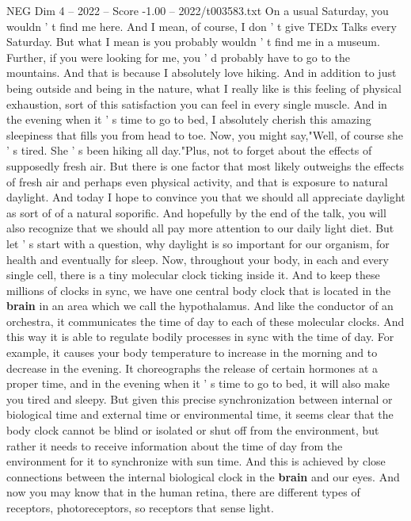 \begin{textsample}{NEG Dim 4 – 2022 – Score -1.00 – 2022/t003583.txt}  \label{ex:f4_neg_056}
On a usual Saturday, you wouldn ' t find me here.
And I mean, of course, I don ' t give TEDx Talks every Saturday.
But what I mean is you probably wouldn ' t find me in a museum.
Further, if you were looking for me, you ' d probably have to go to the mountains.
And that is because I absolutely love hiking.
And in addition to just being outside and being in the nature, what I really like is this feeling of physical exhaustion, sort of this satisfaction you can feel in every single muscle.
And in the evening when it ' s time to go to bed, I absolutely cherish this amazing sleepiness that fills you from head to toe.
Now, you might say,"Well, of course she ' s tired.
She ' s been hiking all day."Plus, not to forget about the effects of supposedly fresh air.
But there is one factor that most likely outweighs the effects of fresh air and perhaps even physical activity, and that is exposure to natural daylight.
And today I hope to convince you that we should all appreciate daylight as sort of of a natural soporific.
And hopefully by the end of the talk, you will also recognize that we should all pay more attention to our daily light diet.
But let ' s start with a question, why daylight is so important for our organism, for health and eventually for sleep.
Now, throughout your body, in each and every single cell, there is a tiny molecular clock ticking inside it.
And to keep these millions of clocks in sync, we have one central body clock that is located in the \textbf{brain} in an area which we call the hypothalamus.
And like the conductor of an orchestra, it communicates the time of day to each of these molecular clocks.
And this way it is able to regulate bodily processes in sync with the time of day.
For example, it causes your body temperature to increase in the morning and to decrease in the evening.
It choreographs the release of certain hormones at a proper time, and in the evening when it ' s time to go to bed, it will also make you tired and sleepy.
But given this precise synchronization between internal or biological time and external time or environmental time, it seems clear that the body clock cannot be blind or isolated or shut off from the environment, but rather it needs to receive information about the time of day from the environment for it to synchronize with sun time.
And this is achieved by close connections between the internal biological clock in the \textbf{brain} and our eyes.
And now you may know that in the human retina, there are different types of receptors, photoreceptors, so receptors that sense light.

\end{textsample}
